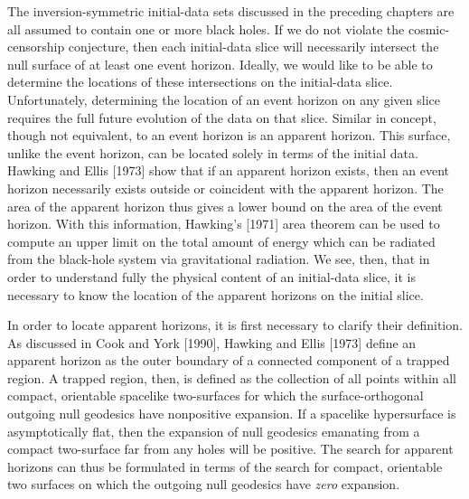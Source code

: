 The inversion-symmetric initial-data sets discussed in the preceding chapters
are all assumed to contain one or more black holes.  If we do not violate the
cosmic-censorship conjecture, then each initial-data slice will necessarily
intersect the null surface of at least one event horizon.  Ideally, we would
like to be able to determine the locations of these intersections on the
initial-data slice.  Unfortunately, determining the location of an event horizon
on any given slice requires the full future evolution of the data on that
slice.  Similar in concept, though not equivalent, to an event horizon is an
apparent horizon.  This surface, unlike the event horizon, can be located solely
in terms of the initial data.  Hawking and Ellis [1973] show that if an apparent
horizon exists, then an event horizon necessarily exists outside or coincident
with the apparent horizon.  The area of the apparent horizon thus gives a lower
bound on the area of the event horizon.  With this information, Hawking's [1971]
area theorem can be used to compute an upper limit on the total amount of energy
which can be radiated from the black-hole system via gravitational radiation. We
see, then, that in order to understand fully the physical content of an
initial-data slice, it is necessary to know the location of the apparent
horizons on the initial slice.

In order to locate apparent horizons, it is first necessary to clarify their
definition.  As discussed in Cook and York [1990], Hawking and Ellis [1973]
define an apparent horizon as the outer boundary of a connected component of a
trapped region.  A trapped region, then, is defined as the collection of all
points within all compact, orientable spacelike two-surfaces for which the
surface-orthogonal outgoing null geodesics have nonpositive expansion.  If a
spacelike hypersurface is asymptotically flat, then the expansion of null
geodesics emanating from a compact two-surface far from any holes will be
positive.  The search for apparent horizons can thus be formulated in terms of
the search for compact, orientable two surfaces on which the outgoing null
geodesics have {\it zero} expansion.

